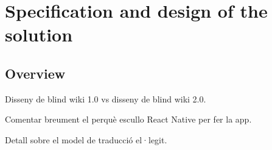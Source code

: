 \section{Specification and design of the solution}

\subsection{Overview}


Disseny de blind wiki 1.0 vs disseny de blind wiki 2.0.


Comentar breument el perquè escullo React Native per fer la app.

Detall sobre el model de traducció el·legit.